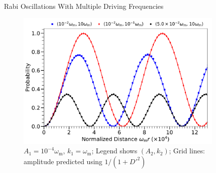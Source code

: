 \begin{frame}{Rabi Oscillations With Multiple Driving Frequencies}



\begin{figure}
\includegraphics[width=0.9\textwidth]{assets/interference-reduction-slide-with-legend}
\caption*{$A_1=10^{-4}\omega_{\mathrm m}$, $k_1= \omega_{\mathrm m}$; Legend shows $(A_2, k_2)$; Grid lines: amplitude predicted using $1/(1+D'^2)$
}
\end{figure}




\end{frame}



